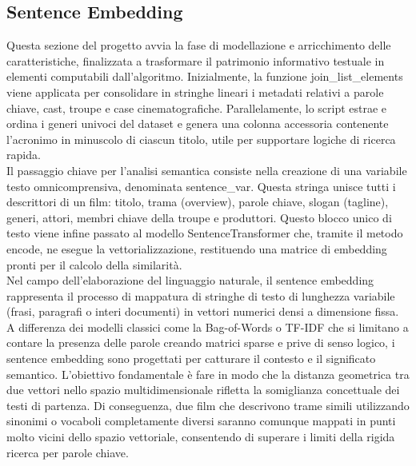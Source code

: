 \documentclass{article}
\begin{document}
\subsection{Sentence Embedding}
Questa sezione del progetto avvia la fase di modellazione e arricchimento delle caratteristiche, finalizzata a trasformare il patrimonio informativo testuale in elementi computabili dall'algoritmo. Inizialmente, la funzione join\_list\_elements viene applicata per consolidare in stringhe lineari i metadati relativi a parole chiave, cast, troupe e case cinematografiche. Parallelamente, lo script estrae e ordina i generi univoci del dataset e genera una colonna accessoria contenente l'acronimo in minuscolo di ciascun titolo, utile per supportare logiche di ricerca rapida.\\
Il passaggio chiave per l'analisi semantica consiste nella creazione di una variabile testo omnicomprensiva, denominata sentence\_var. Questa stringa unisce tutti i descrittori di un film: titolo, trama (overview), parole chiave, slogan (tagline), generi, attori, membri chiave della troupe e produttori. Questo blocco unico di testo viene infine passato al modello SentenceTransformer che, tramite il metodo encode, ne esegue la vettorializzazione, restituendo una matrice di embedding pronti per il calcolo della similarit\`a.\\
Nel campo dell'elaborazione del linguaggio naturale, il sentence embedding rappresenta il processo di mappatura di stringhe di testo di lunghezza variabile (frasi, paragrafi o interi documenti) in vettori numerici densi a dimensione fissa.\\
A differenza dei modelli classici come la Bag-of-Words o TF-IDF che si limitano a contare la presenza delle parole creando matrici sparse e prive di senso logico, i sentence embedding sono progettati per catturare il contesto e il significato semantico. L'obiettivo fondamentale \`e fare in modo che la distanza geometrica tra due vettori nello spazio multidimensionale rifletta la somiglianza concettuale dei testi di partenza. Di conseguenza, due film che descrivono trame simili utilizzando sinonimi o vocaboli completamente diversi saranno comunque mappati in punti molto vicini dello spazio vettoriale, consentendo di superare i limiti della rigida ricerca per parole chiave.
\end{document}
